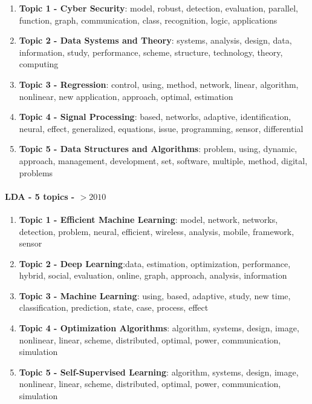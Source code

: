 \documentclass[fleqn,10pt]{SelfArx} %
\begin{document}
\begin{enumerate}
    \item \textbf{Topic 1 - Cyber Security}: model, robust, detection, evaluation, parallel, function, graph, communication, class, recognition, logic, applications
    \item \textbf{Topic 2 - Data Systems and Theory}: systems, analysis, design, data, information, study, performance, scheme, structure, technology, theory, computing
    \item \textbf{Topic 3 - Regression}: control, using, method, network, linear, algorithm, nonlinear, new application, approach, optimal, estimation
    \item \textbf{Topic 4 - Signal Processing}: based, networks, adaptive, identification, neural, effect, generalized, equations, issue, programming, sensor, differential
    \item \textbf{Topic 5 - Data Structures and Algorithms}: problem, using, dynamic, approach, management, development, set, software, multiple, method, digital, problems
\end{enumerate}

\vspace{0.2cm}

\paragraph{LDA - 5 topics - $> 2010$} 

\begin{enumerate}
    \item \textbf{Topic 1 - Efficient Machine Learning}: model, network, networks, detection, problem, neural, efficient, wireless, analysis, mobile, framework, sensor
    \item \textbf{Topic 2 - Deep Learning}:data, estimation, optimization, performance, hybrid, social, evaluation, online, graph, approach, analysis, information
    \item \textbf{Topic 3 - Machine Learning}: using, based, adaptive, study, new time, classification, prediction, state, case, process, effect
    \item \textbf{Topic 4 - Optimization Algorithms}: algorithm, systems, design, image, nonlinear, linear, scheme, distributed, optimal, power, communication, simulation
    \item \textbf{Topic 5 - Self-Supervised Learning}: algorithm, systems, design, image, nonlinear, linear, scheme, distributed, optimal, power, communication, simulation
\end{enumerate}
\end{document}
